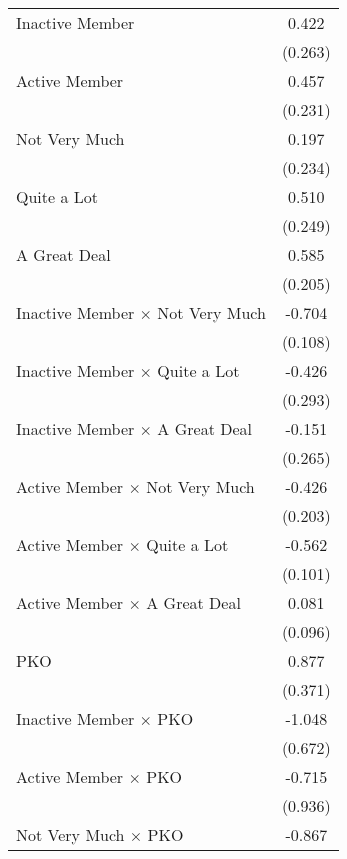 \begin{center}
\begin{singlespace}
\begin{longtable}{l c}
Inactive Member     &       0.422        \\
                    &     (0.263)        \\
[0.25em]
Active Member       &       0.457\sym{*} \\
                    &     (0.231)        \\
[0.25em]
Not Very Much       &       0.197        \\
                    &     (0.234)        \\
[0.25em]
Quite a Lot         &       0.510\sym{*} \\
                    &     (0.249)        \\
[0.25em]
A Great Deal        &       0.585\sym{**}\\
                    &     (0.205)        \\
[0.25em]
Inactive Member $\times$ Not Very Much&      -0.704\sym{**}\\
                    &     (0.108)        \\
[0.25em]
Inactive Member $\times$ Quite a Lot&      -0.426        \\
                    &     (0.293)        \\
[0.25em]
Inactive Member $\times$ A Great Deal&      -0.151        \\
                    &     (0.265)        \\
[0.25em]
Active Member $\times$ Not Very Much&      -0.426\sym{*} \\
                    &     (0.203)        \\
[0.25em]
Active Member $\times$ Quite a Lot&      -0.562\sym{**}\\
                    &     (0.101)        \\
[0.25em]
Active Member $\times$ A Great Deal&       0.081        \\
                    &     (0.096)        \\
[0.25em]
PKO &       0.877\sym{*} \\
                    &     (0.371)        \\
[0.25em]
Inactive Member $\times$ PKO&      -1.048        \\
                    &     (0.672)        \\
[0.25em]
Active Member $\times$ PKO&      -0.715        \\
                    &     (0.936)        \\
[0.25em]
Not Very Much $\times$ PKO&      -0.867\sym{**}\\

\end{longtable}
\end{singlespace}
\end{center}
